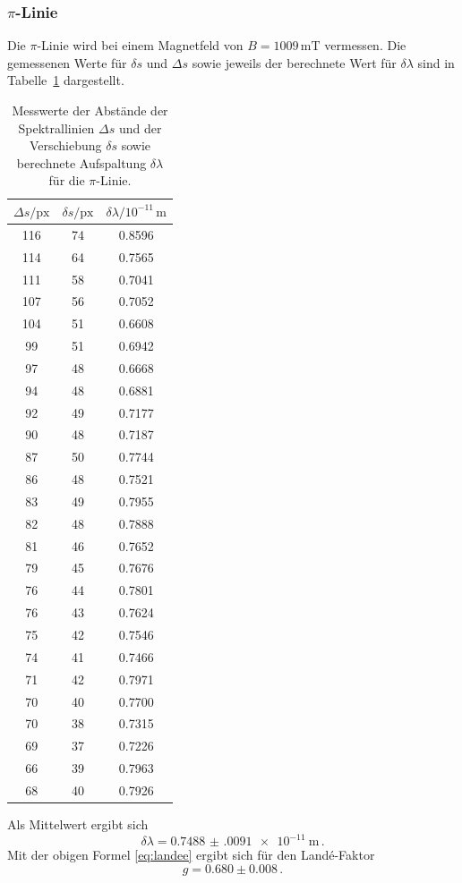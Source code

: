 \subsubsection*{$\pi$-Linie}
Die $\pi$-Linie wird bei einem Magnetfeld von $B = 1009 \, \si{\milli\tesla}$ vermessen.
Die gemessenen Werte für 
$\delta s$ und $\Delta s$ sowie jeweils der berechnete Wert für $\delta \lambda$ sind in Tabelle \ref{tab:atab3} dargestellt.
\FloatBarrier
\begin{table}[h]
    \centering
    \caption{Messwerte der Abstände der Spektrallinien $\Delta s$ und der Verschiebung $\delta s$ sowie berechnete Aufspaltung $\delta \lambda$ für die $\pi$-Linie.}
    \label{tab:atab3}
    \begin{tabular}{c c c}
        \toprule
        {$\Delta s / \text{px}$} & {$\delta s / \text{px}$} & {$\delta \lambda / 10^{-11}\, \si{\meter}$}\\
        \midrule
        116 & 74 & 0.8596 \\
        114 & 64 & 0.7565 \\
        111 & 58 & 0.7041 \\
        107 & 56 & 0.7052 \\
        104 & 51 & 0.6608 \\
        99  & 51 & 0.6942 \\
        97  & 48 & 0.6668 \\
        94  & 48 & 0.6881 \\
        92  & 49 & 0.7177 \\
        90  & 48 & 0.7187 \\
        87  & 50 & 0.7744 \\
        86  & 48 & 0.7521 \\
        83  & 49 & 0.7955 \\
        82  & 48 & 0.7888 \\
        81  & 46 & 0.7652 \\
        79  & 45 & 0.7676 \\
        76  & 44 & 0.7801 \\
        76  & 43 & 0.7624 \\
        75  & 42 & 0.7546 \\
        74  & 41 & 0.7466 \\
        71  & 42 & 0.7971 \\
        70  & 40 & 0.7700 \\
        70  & 38 & 0.7315 \\
        69  & 37 & 0.7226 \\
        66  & 39 & 0.7963 \\
        68  & 40 & 0.7926 \\
        \bottomrule
    \end{tabular}
\end{table}
\FloatBarrier
\noindent
Als Mittelwert ergibt sich
\begin{equation*}
    \delta \lambda = \SI{0.7488(0091)e-11}{\meter} \, .
\end{equation*}
Mit der obigen Formel \eqref{eq:landee} ergibt sich für den Landé-Faktor
\begin{equation*}
    g = 0.680 \pm 0.008 \, .
\end{equation*}

